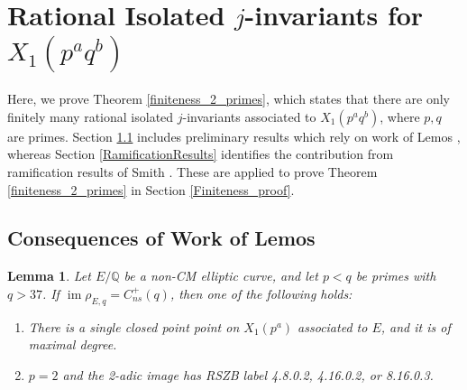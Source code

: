 \documentclass{amsart}
\newtheorem{lemma}{Lemma}
\theoremstyle{definition}
\newcommand{\Q}{\mathbb{Q}}
\DeclareMathOperator{\im}{im}
\begin{document}
\section{Rational Isolated $j$-invariants for $X_1(p^aq^b)$}\label{Section4}

    Here, we prove Theorem \ref{finiteness_2_primes}, which states that there are only finitely many rational isolated $j$-invariants associated to $X_1(p^aq^b)$, where $p,q$ are primes. Section \ref{prelim_Lemos} includes preliminary results which rely on work of Lemos \cite{lemosTrans,lemosZ}, whereas Section \ref{RamificationResults} identifies the contribution from ramification results of Smith \cite{Smith23}. These are applied to prove  Theorem \ref{finiteness_2_primes} in Section \ref{Finiteness_proof}.
\subsection{Consequences of Work of Lemos}\label{prelim_Lemos} 
\begin{lemma}\label{Lemma1}
Let $E/\Q$ be a non-CM elliptic curve, and let $p<q$ be primes with $q>37$. If $\im\rho_{E,q}=C_{ns}^+(q)$, then one of the following holds:
\begin{enumerate}
    \item There is a single closed point point on $X_1(p^a)$ associated to $E$, and it is of maximal degree.
    \item $p=2$ and the 2-adic image has RSZB label 4.8.0.2, 4.16.0.2, or 8.16.0.3.
\end{enumerate} 
\end{lemma}
\end{document}
